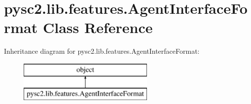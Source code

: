 \hypertarget{classpysc2_1_1lib_1_1features_1_1_agent_interface_format}{}\section{pysc2.\+lib.\+features.\+Agent\+Interface\+Format Class Reference}
\label{classpysc2_1_1lib_1_1features_1_1_agent_interface_format}
Inheritance diagram for pysc2.\+lib.\+features.\+Agent\+Interface\+Format\+:\begin{figure}[H]
\begin{center}
\leavevmode
\includegraphics[height=2.000000cm]{classpysc2_1_1lib_1_1features_1_1_agent_interface_format}
\end{center}
\end{figure}
